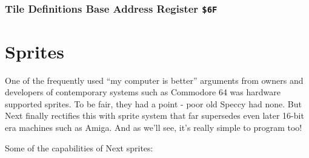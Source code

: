 \documentclass[12pt,twoside,openright,a4paper]{book}
\begin{document}
\subsubsection{Tile Definitions Base Address Register {\tt \$6F}}

\begin{NextPort}
\end{NextPort}


\pagebreak
\IntentionallyEmpty
\pagebreak

\section{Sprites}
\label{zx_next_sprites}


One of the frequently used ``my computer is better'' arguments from owners and developers of contemporary systems such as Commodore 64 was hardware supported sprites. To be fair, they had a point - poor old Speccy had none. But Next finally rectifies this with sprite system that far supersedes even later 16-bit era machines such as Amiga. And as we'll see, it's really simple to program too!

Some of the capabilities of Next sprites:
\end{document}

